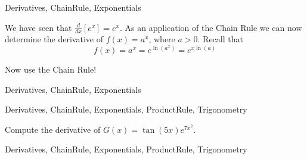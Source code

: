 

	
\begin{tagblock}{Derivatives, ChainRule, Exponentials}
\begin{question}
	

We have seen that $\frac{d}{dx}[e^x] = e^x$.  As an application of the Chain Rule we can now determine the derivative of $f(x) = a^x$, where $a>0$.  Recall that 
\[f(x) = a^x = e^{\ln(a^x)} = e^{x \ln(a)} \]

Now use the Chain Rule!


	
\begin{tags}
	    Derivatives, ChainRule, Exponentials
\end{tags}
	
\begin{diary}
\end{diary}
	
\begin{solution}
	   
\end{solution}
	
\end{question}

\end{tagblock}



	
\begin{tagblock}{Derivatives, ChainRule, Exponentials, ProductRule, Trigonometry}
\begin{question}
	

Compute the derivative of $G(x) = \tan(5x) e^{7x^2}$. 


	
\begin{tags}
	    Derivatives, ChainRule, Exponentials, ProductRule, Trigonometry
\end{tags}
	
\begin{diary}
\end{diary}
	
\begin{solution}
	   
\end{solution}
	
\end{question}

\end{tagblock}

